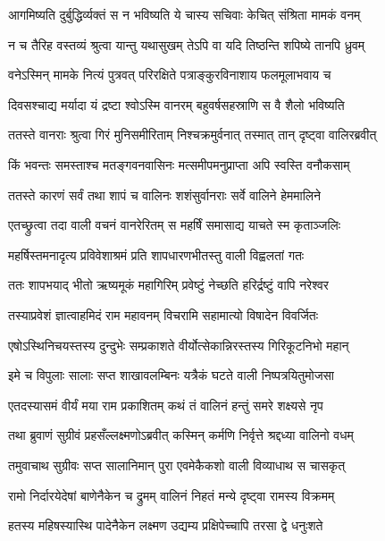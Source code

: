 \twolineshloka
{आगमिष्यति दुर्बुद्धिर्व्यक्तं स न भविष्यति}
{ये चास्य सचिवाः केचित् संश्रिता मामकं वनम्} %

\twolineshloka
{न च तैरिह वस्तव्यं श्रुत्वा यान्तु यथासुखम्}
{तेऽपि वा यदि तिष्ठन्ति शपिष्ये तानपि ध्रुवम्} %

\twolineshloka
{वनेऽस्मिन् मामके नित्यं पुत्रवत् परिरक्षिते}
{पत्राङ्कुरविनाशाय फलमूलाभवाय च} %

\twolineshloka
{दिवसश्चाद्य मर्यादा यं द्रष्टा श्वोऽस्मि वानरम्}
{बहुवर्षसहस्राणि स वै शैलो भविष्यति} %

\twolineshloka
{ततस्ते वानराः श्रुत्वा गिरं मुनिसमीरिताम्}
{निश्चक्रमुर्वनात् तस्मात् तान् दृष्ट्वा वालिरब्रवीत्} %

\twolineshloka
{किं भवन्तः समस्ताश्च मतङ्गवनवासिनः}
{मत्समीपमनुप्राप्ता अपि स्वस्ति वनौकसाम्} %

\twolineshloka
{ततस्ते कारणं सर्वं तथा शापं च वालिनः}
{शशंसुर्वानराः सर्वे वालिने हेममालिने} %

\twolineshloka
{एतच्छ्रुत्वा तदा वाली वचनं वानरेरितम्}
{स महर्षिं समासाद्य याचते स्म कृताञ्जलिः} %

\twolineshloka
{महर्षिस्तमनादृत्य प्रविवेशाश्रमं प्रति}
{शापधारणभीतस्तु वाली विह्वलतां गतः} %

\twolineshloka
{ततः शापभयाद् भीतो ऋष्यमूकं महागिरिम्}
{प्रवेष्टुं नेच्छति हरिर्द्रष्टुं वापि नरेश्वर} %

\twolineshloka
{तस्याप्रवेशं ज्ञात्वाहमिदं राम महावनम्}
{विचरामि सहामात्यो विषादेन विवर्जितः} %

\twolineshloka
{एषोऽस्थिनिचयस्तस्य दुन्दुभेः सम्प्रकाशते}
{वीर्योत्सेकान्निरस्तस्य गिरिकूटनिभो महान्} %

\twolineshloka
{इमे च विपुलाः सालाः सप्त शाखावलम्बिनः}
{यत्रैकं घटते वाली निष्पत्रयितुमोजसा} %

\twolineshloka
{एतदस्यासमं वीर्यं मया राम प्रकाशितम्}
{कथं तं वालिनं हन्तुं समरे शक्ष्यसे नृप} %

\twolineshloka
{तथा ब्रुवाणं सुग्रीवं प्रहसँल्लक्ष्मणोऽब्रवीत्}
{कस्मिन् कर्मणि निर्वृत्ते श्रद्दध्या वालिनो वधम्} %

\twolineshloka
{तमुवाचाथ सुग्रीवः सप्त सालानिमान् पुरा}
{एवमेकैकशो वाली विव्याधाथ स चासकृत्} %

\twolineshloka
{रामो निर्दारयेदेषां बाणेनैकेन च द्रुमम्}
{वालिनं निहतं मन्ये दृष्ट्वा रामस्य विक्रमम्} %

\twolineshloka
{हतस्य महिषस्यास्थि पादेनैकेन लक्ष्मण}
{उद्यम्य प्रक्षिपेच्चापि तरसा द्वे धनुःशते} %

